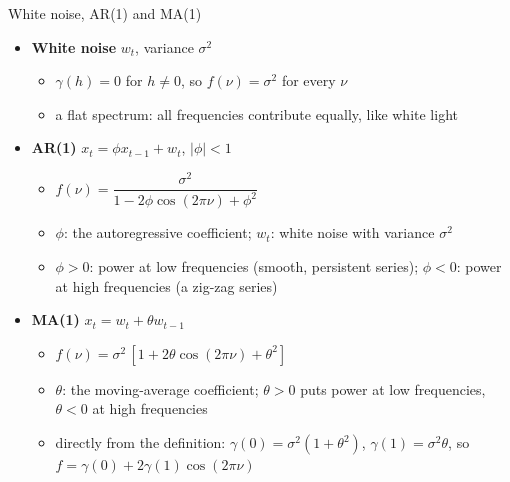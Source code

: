 \begin{frame}{White noise, AR(1) and MA(1)}
\itemsize{\footnotesize}
\begin{itemize}
    \item \textbf{White noise} $w_t$, variance $\sigma^2$
    \begin{itemize}
        \item $\gamma(h) = 0$ for $h \ne 0$, so $f(\nu) = \sigma^2$ for every $\nu$
        \item a flat spectrum: all frequencies contribute equally, like white light
    \end{itemize}
    \item \textbf{AR(1)} $x_t = \phi x_{t-1} + w_t$, $|\phi| < 1$
    \begin{itemize}
        \item $f(\nu) = \dfrac{\sigma^2}{1 - 2\phi\cos(2\pi\nu) + \phi^2}$
        \item $\phi$: the autoregressive coefficient; $w_t$: white noise with variance $\sigma^2$
        \item $\phi > 0$: power at low frequencies (smooth, persistent series); $\phi < 0$: power at high frequencies (a zig-zag series)
    \end{itemize}
    \item \textbf{MA(1)} $x_t = w_t + \theta w_{t-1}$
    \begin{itemize}
        \item $f(\nu) = \sigma^2\,[1 + 2\theta\cos(2\pi\nu) + \theta^2]$
        \item $\theta$: the moving-average coefficient; $\theta > 0$ puts power at low frequencies, $\theta < 0$ at high frequencies
        \item directly from the definition: $\gamma(0) = \sigma^2(1 + \theta^2)$, $\gamma(1) = \sigma^2\theta$, so $f = \gamma(0) + 2\gamma(1)\cos(2\pi\nu)$
    \end{itemize}
\end{itemize}
\end{frame}

